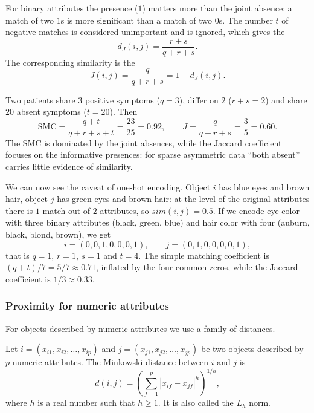 For  binary attributes the presence ($1$) matters more than the joint absence: a match of two $1$s is more significant than a match of two $0$s. The number $t$ of negative matches is considered unimportant and is ignored, which gives the 
\[
    d_J(i,j)=\frac{r+s}{q+r+s}.
\]
The corresponding similarity is the 
\[
    J(i,j)=\frac{q}{q+r+s}=1-d_J(i,j).
\]

\begin{example}
Two patients share $3$ positive symptoms ($q=3$), differ on $2$ ($r+s=2$) and share $20$ absent symptoms ($t=20$). Then
\[
    \text{SMC}=\frac{q+t}{q+r+s+t}=\frac{23}{25}=0.92,\qquad J=\frac{q}{q+r+s}=\frac{3}{5}=0.60.
\]
The SMC is dominated by the joint absences, while the Jaccard coefficient focuses on the informative presences: for sparse asymmetric data ``both absent'' carries little evidence of similarity.
\end{example}

\begin{example}
We can now see the caveat of one-hot encoding. Object $i$ has blue eyes and brown hair, object $j$ has green eyes and brown hair: at the level of the original attributes there is $1$ match out of $2$ attributes, so $sim(i,j)=0.5$. If we encode eye color with three binary attributes (black, green, blue) and hair color with four (auburn, black, blond, brown), we get
\[
    i=(0,0,1,0,0,0,1),\qquad j=(0,1,0,0,0,0,1),
\]
that is $q=1$, $r=1$, $s=1$ and $t=4$. The simple matching coefficient is $(q+t)/7=5/7\approx 0.71$, inflated by the four common zeros, while the Jaccard coefficient is $1/3\approx 0.33$.
\end{example}

\subsubsection{Proximity for numeric attributes}
For objects described by numeric attributes we use a family of distances.

\begin{definition}
Let $i=(x_{i1},x_{i2},\dots,x_{ip})$ and $j=(x_{j1},x_{j2},\dots,x_{jp})$ be two objects described by $p$ numeric attributes. The Minkowski distance between $i$ and $j$ is
\[
    d(i,j)=\left(\sum_{f=1}^{p}|x_{if}-x_{jf}|^h\right)^{1/h},
\]
where $h$ is a real number such that $h\geq 1$. It is also called the $L_h$ norm.
\end{definition}

